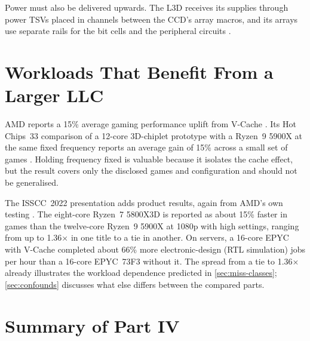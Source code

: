 Power must also be delivered upwards. The L3D receives its supplies through power TSVs placed in channels between the CCD's array macros, and its arrays use separate rails for the bit cells and the peripheral circuits \cite[slides~24--25]{wuu2022vcache}.


\section{Workloads That Benefit From a Larger LLC}
\label{sec:vcache-workloads}

AMD reports a 15\% average gaming performance uplift from V-Cache \cite{wuu2022vcache}. Its Hot Chips~33 comparison of a 12-core 3D-chiplet prototype with a Ryzen~9 5900X at the same fixed frequency reports an average gain of 15\% across a small set of games \cite{swaminathanAdvancedPackagingEnabling2021}. Holding frequency fixed is valuable because it isolates the cache effect, but the result covers only the disclosed games and configuration and should not be generalised.

The ISSCC~2022 presentation adds product results, again from AMD's own testing \cite[slides~29, 31, 35]{wuu2022vcache}. The eight-core Ryzen~7 5800X3D is reported as about 15\% faster in games than the twelve-core Ryzen~9 5900X at 1080p with high settings, ranging from up to 1.36$\times$ in one title to a tie in another. On servers, a 16-core EPYC with V-Cache completed about 66\% more electronic-design (RTL simulation) jobs per hour than a 16-core EPYC~73F3 without it. The spread from a tie to 1.36$\times$ already illustrates the workload dependence predicted in \cref{sec:miss-classes}; \cref{sec:confounds} discusses what else differs between the compared parts.


\section{Summary of Part IV}
